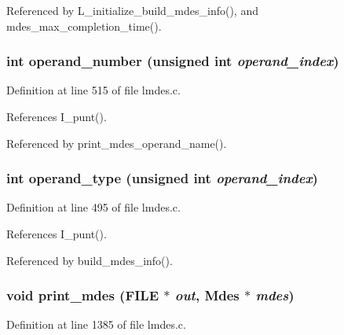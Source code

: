Referenced by L\_\-initialize\_\-build\_\-mdes\_\-info(), and mdes\_\-max\_\-completion\_\-time().
\subsubsection{\setlength{\rightskip}{0pt plus 5cm}int operand\_\-number (unsigned int {\em operand\_\-index})}\label{lmdes_8c_ff92d6b9d3171335fbe5b748e0b54a74}




Definition at line 515 of file lmdes.c.

References I\_\-punt().

Referenced by print\_\-mdes\_\-operand\_\-name().
\subsubsection{\setlength{\rightskip}{0pt plus 5cm}int operand\_\-type (unsigned int {\em operand\_\-index})}\label{lmdes_8c_b5521bc27b7c95d668c2641a6dfcd715}




Definition at line 495 of file lmdes.c.

References I\_\-punt().

Referenced by build\_\-mdes\_\-info().
\subsubsection{\setlength{\rightskip}{0pt plus 5cm}void print\_\-mdes (FILE $\ast$ {\em out}, \bf{Mdes} $\ast$ {\em mdes})}\label{lmdes_8c_41090f500ae1c4c9214bbbf9926b249a}




Definition at line 1385 of file lmdes.c.

